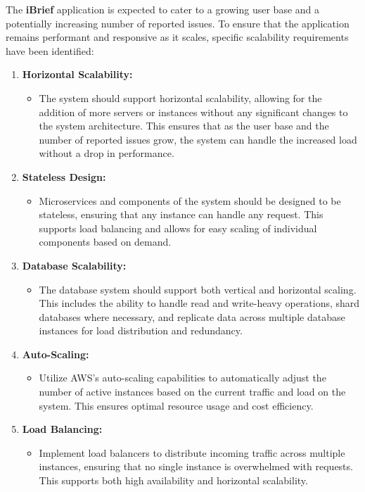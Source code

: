 The \textbf{iBrief} application is expected to cater to a growing user base and a potentially increasing number of reported issues. To ensure that the application remains performant and responsive as it scales, specific scalability requirements have been identified:

\begin{enumerate}
    \item \textbf{Horizontal Scalability:} 
    \begin{itemize}
        \item The system should support horizontal scalability, allowing for the addition of more servers or instances without any significant changes to the system architecture. This ensures that as the user base and the number of reported issues grow, the system can handle the increased load without a drop in performance.
    \end{itemize}
    
    \item \textbf{Stateless Design:}
    \begin{itemize}
        \item Microservices and components of the system should be designed to be stateless, ensuring that any instance can handle any request. This supports load balancing and allows for easy scaling of individual components based on demand.
    \end{itemize}
    
    \item \textbf{Database Scalability:}
    \begin{itemize}
        \item The database system should support both vertical and horizontal scaling. This includes the ability to handle read and write-heavy operations, shard databases where necessary, and replicate data across multiple database instances for load distribution and redundancy.
    \end{itemize}
    
    \item \textbf{Auto-Scaling:}
    \begin{itemize}
        \item Utilize AWS's auto-scaling capabilities to automatically adjust the number of active instances based on the current traffic and load on the system. This ensures optimal resource usage and cost efficiency.
    \end{itemize}
    
    \item \textbf{Load Balancing:}
    \begin{itemize}
        \item Implement load balancers to distribute incoming traffic across multiple instances, ensuring that no single instance is overwhelmed with requests. This supports both high availability and horizontal scalability.
    \end{itemize}
    

\end{enumerate}
